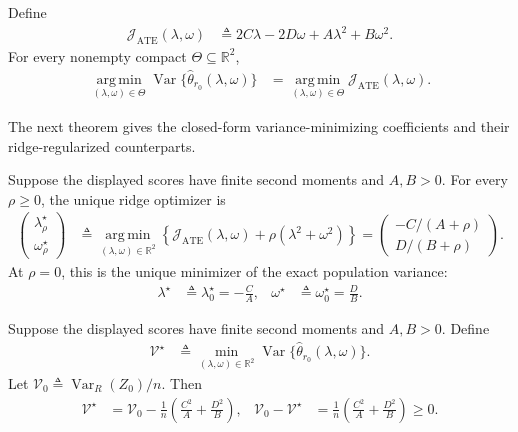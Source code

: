 \begin{proposition}
\label{def:ate-coefficient-objective}
\label{prop:ate-argmin-equivalence}
	Define
	\begin{align*}
		\mathcal J_{\mathrm{ATE}}(\lambda,\omega) &\triangleq 2C\lambda-2D\omega+A\lambda^2+B\omega^2.
	\end{align*}
	For every nonempty compact $\Theta\subseteq\mathbb R^2$,
	\begin{align*}
		\operatorname*{arg\,min}_{(\lambda,\omega)\in\Theta} \operatorname{Var}\{\widehat\theta_{r_0}(\lambda,\omega)\} &=
		\operatorname*{arg\,min}_{(\lambda,\omega)\in\Theta}
		\mathcal J_{\mathrm{ATE}}(\lambda,\omega).
	\end{align*}
\end{proposition}

The next theorem gives the closed-form variance-minimizing coefficients and their ridge-regularized counterparts.

\begin{theorem}
\label{def:ate-joint-ridge-oracles}
\label{thm:joint-oracle}
	Suppose the displayed scores have finite second moments and $A,B>0$. For
	every $\rho\geq0$, the unique ridge optimizer is
	\begin{align}
		\begin{pmatrix}
			\lambda_\rho^\star\\
			\omega_\rho^\star
		\end{pmatrix}
		&\triangleq
		\operatorname*{arg\,min}_{(\lambda,\omega)\in\mathbb R^2}
		\left\{\mathcal J_{\mathrm{ATE}}(\lambda,\omega)
		+\rho(\lambda^2+\omega^2)\right\}
		=
		\begin{pmatrix}
			-C/(A+\rho)\\
			D/(B+\rho)
		\end{pmatrix}.
		\label{eq:ridge-oracle}
	\end{align}
	At $\rho=0$, this is the unique minimizer of the exact population variance:
	\begin{align}
		\lambda^\star&\triangleq\lambda_0^\star=-\frac CA,
		&
		\omega^\star&\triangleq\omega_0^\star=\frac DB.
		\label{eq:axis-oracle}
	\end{align}
\end{theorem}

\begin{theoremcorollary}
\label{cor:joint-oracle-variance}
\label{cor:ate-separable-oracle}
	Suppose the displayed scores have finite second moments and $A,B>0$. Define
\begin{align}\label{eq:ate-minimum-definition}
	\mathcal V^\star
	&\triangleq
	\min_{(\lambda,\omega)\in\mathbb R^2}
	\operatorname{Var}\{\widehat\theta_{r_0}(\lambda,\omega)\}.
\end{align}
Let $\mathcal V_0\triangleq\operatorname{Var}_R(Z_0)/n$. Then
\begin{align}\label{eq:ate-separable-minimum}
	\mathcal V^\star
	&=
	\mathcal V_0-
	\frac1n\left(\frac{C^2}{A}+\frac{D^2}{B}\right),
	&
	\mathcal V_0-\mathcal V^\star
	&=
	\frac1n\left(\frac{C^2}{A}+\frac{D^2}{B}\right)\geq0.
\end{align}
\end{theoremcorollary}

